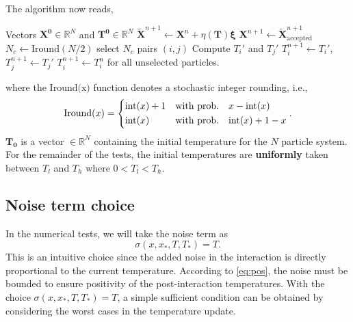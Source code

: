 \documentclass[10pt,a4paper]{article}
\theoremstyle{theorem}
\numberwithin{equation}{section}
\begin{document}
The algorithm now reads,

\begin{algorithm}[htb]
\caption{Collective Annealing by Switching Temperatures}\label{alg:nb}
\begin{algorithmic}[1]
\Require Vectors $\mathbf{X^0}\in\mathbb{R}^N$ and $\mathbf{T^0}\in\mathbb{R}^N$
\State $\widetilde{\mathbf{X}}^{n+1}\gets \mathbf{X}^n+\eta(\mathbf{T})\mathbf{\xi}$ 
\State $\mathbf{X}^{n+1} \gets \widetilde{\mathbf{X}}^{n+1}_{\text{accepted}}$ 
\State $N_c \gets \text{Iround}(N/2)$
\State select $N_c$ pairs $(i,j)$ 
\State Compute $T_i'$ and $T_j'$ 
\State $T_i^{n+1} \gets T_i'$, $T_j^{n+1} \gets T_j'$
\EndFor
\State $T_i^{n+1} \gets T_i^n$ for all unselected particles.
\EndFor
\end{algorithmic}
\end{algorithm}
where the $\text{Iround(x)}$ function denotes a stochastic integer rounding, i.e.,
\begin{equation*}
\text{Iround}(x)=\begin{dcases}
\text{int}(x)+1 & \text{with prob.}\quad x-\text{int}(x)\\
\text{int}(x) & \text{with prob.}\quad \text{int}(x)+1-x\\
\end{dcases} .
\end{equation*}
$\mathbf{T_0}$ is a vector $\in\mathbb{R}^N$ containing the initial temperature for the $N$ particle system. For the remainder of the tests, the initial temperatures are \textbf{uniformly} taken between $T_l$ and $T_h$ where $0<T_l<T_h$. 

\subsection{Noise term choice}
\label{sec:noise}
In the numerical tests, we will take the noise term as
\begin{equation}
\label{eq:noise}
\sigma(x,x_*,T,T_*)=T.
\end{equation}
This is an intuitive choice since the added noise in the interaction is directly
proportional to the current temperature. According to \eqref{eq:pos}, the noise
must be bounded to ensure positivity of the post-interaction temperatures. With
the choice \(\sigma(x,x_*,T,T_*)=T\), a simple sufficient condition can be obtained
by considering the worst cases in the temperature update.
\end{document}
